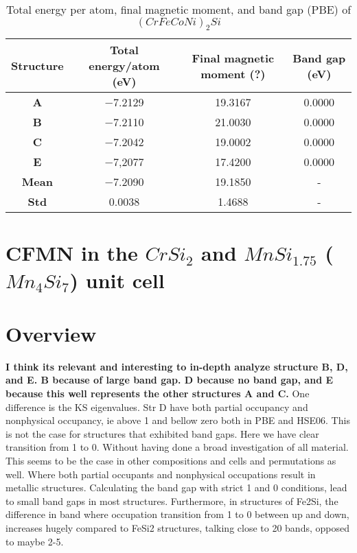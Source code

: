 \begin{table}[H]
\centering
\begin{tabular}{@{}cccc@{}}
\toprule
Structure  & Total energy/atom (eV) & Final magnetic moment (?) & Band gap (eV) \\ \midrule
\textbf{A} & −7.2129                & 19.3167                    & 0.0000        \\
\textbf{B} & −7.2110                & 21.0030                    & 0.0000        \\
\textbf{C} & −7.2042                & 19.0002                    & 0.0000        \\
\textbf{E} & −7,2077                & 17.4200                    & 0.0000             \\
\textbf{Mean} & −7.2090            & 19.1850                  	 & -        \\ 
\textbf{Std} & 0.0038				  & 	1.4688						& -				\\ \bottomrule
\end{tabular}
\caption{Total energy per atom, final magnetic moment, and band gap (PBE) of $(CrFeCoNi)_2Si$  }
\label{table:fesi2_summary}
\end{table}  

\section{CFMN in the $CrSi_2$ and $MnSi_{1.75}$ ($Mn_4Si_7$) unit cell}

\section{Overview}


\textbf{I think its relevant and interesting to in-depth analyze structure B, D, and E. B because of large band gap. D because no band gap, and E because this well represents the other structures A and C. }
One difference is the KS eigenvalues. Str D have both partial occupancy and nonphysical occupancy, ie above 1 and bellow zero both in PBE and HSE06. This is not the case for structures that exhibited band gaps. Here we have clear transition from 1 to 0. Without having done a broad investigation of all material. This seems to be the case in other compositions and cells and permutations as well. Where both partial occupants and nonphysical occupations result in metallic structures. Calculating the band gap with strict 1 and 0 conditions, lead to small band gaps in most structures. Furthermore, in structures of Fe2Si, the difference in band where occupation transition from 1 to 0 between up and down, increases hugely compared to FeSi2 structures, talking close to 20 bands, opposed to maybe 2-5. 
